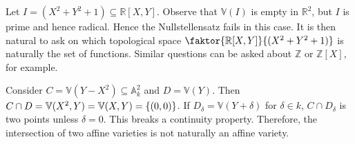 Let \( I = (X^2 + Y^2 + 1) \subseteq \mathbb R[X, Y] \).
Observe that \( \mathbb V(I) \) is empty in \( \mathbb R^2 \), but \( I \) is prime and hence radical.
Hence the Nullstellensatz fails in this case.
It is then natural to ask on which topological space \( \faktor{\mathbb R[X, Y]}{(X^2 + Y^2 + 1)} \) is naturally the set of functions.
Similar questions can be asked about \( \mathbb Z \) or \( \mathbb Z[X] \), for example.

Consider \( C = \mathbb V(Y - X^2) \subseteq \mathbb A^2_k \) and \( D = \mathbb V(Y) \).
Then \( C \cap D = \mathbb V(X^2, Y) = \mathbb V(X, Y) = \qty{(0, 0)} \).
If \( D_\delta = \mathbb V(Y + \delta) \) for \( \delta \in k \), \( C \cap D_\delta \) is two points unless \( \delta = 0 \).
This breaks a continuity property.
Therefore, the intersection of two affine varieties is not naturally an affine variety.
